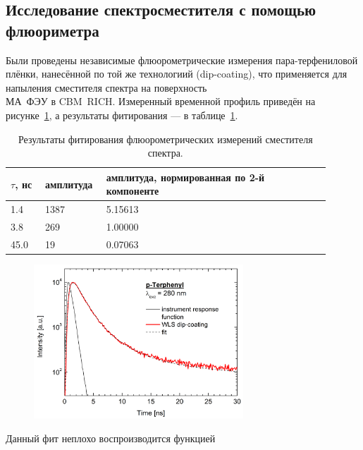 \subsection{Исследование спектросместителя с помощью\\ флюориметра}


Были проведены независимые флюорометрические измерения пара-тер\-фениловой плёнки, нанесённой по той же технологиий (dip-coating), что применяется для напыления сместителя спектра на поверхность\\ МА~ФЭУ в CBM~RICH. Измеренный временной профиль приведён на рисунке~\ref{fig:MichaelProfile}, а результаты фитирования --- в таблице~\ref{tabl:MichaelValues}.

\begin{table}[H]
\caption{Результаты фитирования флюорометрических измерений сместителя спектра.}
\label{tabl:MichaelValues}
\begin{tabular}{ | p{0.1\linewidth} | p{0.15\linewidth} | p{0.65\linewidth} | }
	\hline
		$ \tau $, нс & амплитуда & амплитуда, нормированная по 2-й компоненте \\
	\hline
		1.4 & 1387 & 5.15613 \\
	\hline
		3.8 & 269 & 1.00000 \\
	\hline
		45.0 & 19 & 0.07063 \\
	\hline
\end{tabular}
\end{table}

\begin{figure}[H]
\includegraphics[width=0.7\textwidth]{pictures/Tau_fluoro_WLS_JLU.png}
\caption{}
\label{fig:MichaelProfile}
\end{figure}

Данный фит неплохо воспроизводится функцией

